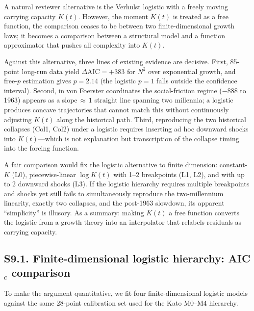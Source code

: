 \documentclass[11pt]{article}
\begin{document}
A natural reviewer alternative is the Verhulst logistic with a freely moving carrying capacity
$K(t)$.
However, the moment $K(t)$ is treated as a free function, the comparison ceases to be between
two finite-dimensional growth laws; it becomes a comparison between a structural model and a
function approximator that pushes all complexity into $K(t)$.

Against this alternative, three lines of existing evidence are decisive.
First, 85-point long-run data yield $\Delta\mathrm{AIC}=+383$ for $N^2$ over exponential growth,
and free-$p$ estimation gives $p=2.14$ (the logistic $p=1$ falls outside the confidence interval).
Second, in von Foerster coordinates the social-friction regime ($-$888 to 1963) appears as a
slope$\,{\approx}\,1$ straight line spanning two millennia; a logistic produces concave trajectories
that cannot match this without continuously adjusting $K(t)$ along the historical path.
Third, reproducing the two historical collapses (Col1, Col2) under a logistic requires inserting
ad hoc downward shocks into $K(t)$---which is not explanation but transcription of the collapse
timing into the forcing function.

A fair comparison would fix the logistic alternative to finite dimension:
constant-$K$ (L0), piecewise-linear $\log K(t)$ with 1--2 breakpoints (L1, L2),
and with up to 2 downward shocks (L3).
If the logistic hierarchy requires multiple breakpoints and shocks yet still fails to
simultaneously reproduce the two-millennium linearity, exactly two collapses, and the
post-1963 slowdown, its apparent ``simplicity'' is illusory.
As a summary: making $K(t)$ a free function converts the logistic from a growth theory into
an interpolator that relabels residuals as carrying capacity.

\subsection*{S9.1. Finite-dimensional logistic hierarchy: AIC$_c$ comparison}

To make the argument quantitative, we fit four finite-dimensional logistic models against the same 28-point calibration set used for the Kato M0--M4 hierarchy.
\end{document}
